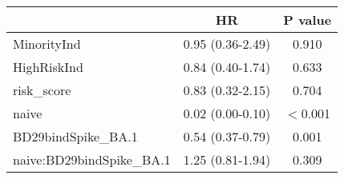 \begin{tabular}{lcc}
   \hline  &HR& P value\\ 
\hline
MinorityInd & 0.95 (0.36-2.49) & 0.910 \\ 
  HighRiskInd & 0.84 (0.40-1.74) & 0.633 \\ 
  risk\_score & 0.83 (0.32-2.15) & 0.704 \\ 
  naive & 0.02 (0.00-0.10) & $<$0.001 \\ 
  BD29bindSpike\_BA.1 & 0.54 (0.37-0.79) & 0.001 \\ 
  naive:BD29bindSpike\_BA.1 & 1.25 (0.81-1.94) & 0.309 \\ 
   \hline
\end{tabular}
